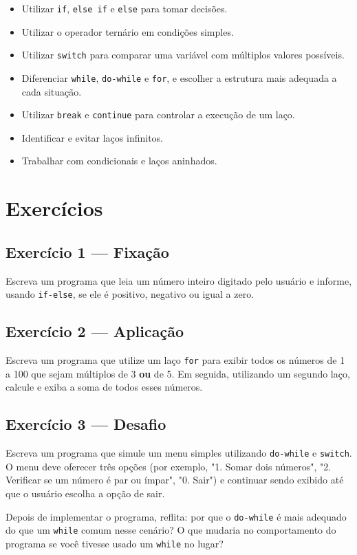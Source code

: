 \begin{objetivos}
\begin{itemize}
    \item Utilizar \texttt{if}, \texttt{else if} e \texttt{else} para tomar decisões.
    \item Utilizar o operador ternário em condições simples.
    \item Utilizar \texttt{switch} para comparar uma variável com múltiplos valores possíveis.
    \item Diferenciar \texttt{while}, \texttt{do-while} e \texttt{for}, e escolher a estrutura mais adequada a cada situação.
    \item Utilizar \texttt{break} e \texttt{continue} para controlar a execução de um laço.
    \item Identificar e evitar laços infinitos.
    \item Trabalhar com condicionais e laços aninhados.
\end{itemize}
\end{objetivos}

\section*{Exercícios}

\begin{exercicio}

\subsection*{Exercício 1 --- Fixação}
Escreva um programa que leia um número inteiro digitado pelo usuário e informe, usando \texttt{if-else}, se ele é positivo, negativo ou igual a zero.

\subsection*{Exercício 2 --- Aplicação}
Escreva um programa que utilize um laço \texttt{for} para exibir todos os números de 1 a 100 que sejam múltiplos de 3 \textbf{ou} de 5. Em seguida, utilizando um segundo laço, calcule e exiba a soma de todos esses números.

\subsection*{Exercício 3 --- Desafio}
Escreva um programa que simule um menu simples utilizando \texttt{do-while} e \texttt{switch}. O menu deve oferecer três opções (por exemplo, "1. Somar dois números", "2. Verificar se um número é par ou ímpar", "0. Sair") e continuar sendo exibido até que o usuário escolha a opção de sair.

Depois de implementar o programa, reflita: por que o \texttt{do-while} é mais adequado do que um \texttt{while} comum nesse cenário? O que mudaria no comportamento do programa se você tivesse usado um \texttt{while} no lugar?

\end{exercicio}

